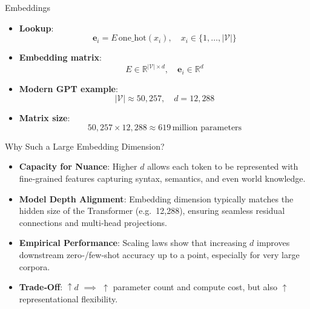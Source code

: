 \documentclass[german,10pt]{beamer}
\begin{document}
\begin{frame}{Embeddings}
  \begin{itemize}
    \item \textbf{Lookup}: 
      \[
        \mathbf{e}_i = E\,\mathrm{one\_hot}(x_i), 
        \quad x_i\in\{1,\dots,|\mathcal{V}|\}
      \]
    \item \textbf{Embedding matrix}: 
      \[
        E\in\mathbb{R}^{|\mathcal{V}|\times d}, \quad \mathbf{e}_i\in\mathbb{R}^d
      \]
    \item \textbf{Modern GPT example}:  
      \[
        |\mathcal{V}| \approx 50{,}257,\quad d = 12{,}288
      \]
    \item \textbf{Matrix size}:  
      \[
        50{,}257 \times 12{,}288 \approx 619\,\text{million parameters}
      \]
  \end{itemize}
\end{frame}
\begin{frame}{Why Such a Large Embedding Dimension?}
  \begin{itemize}
    \item \textbf{Capacity for Nuance}:  
      Higher \(d\) allows each token to be represented with fine‐grained features capturing syntax, semantics, and even world knowledge.  
    \item \textbf{Model Depth Alignment}:  
      Embedding dimension typically matches the hidden size of the Transformer (e.g.\ 12,288), ensuring seamless residual connections and multi‑head projections.  
    \item \textbf{Empirical Performance}:  
      Scaling laws show that increasing \(d\) improves downstream zero‑/few‑shot accuracy up to a point, especially for very large corpora.  
    \item \textbf{Trade‑Off}:  
      \(\uparrow d\) \(\implies\) \(\uparrow\) parameter count and compute cost, but also \(\uparrow\) representational flexibility.
  \end{itemize}
\end{frame}
\end{document}
